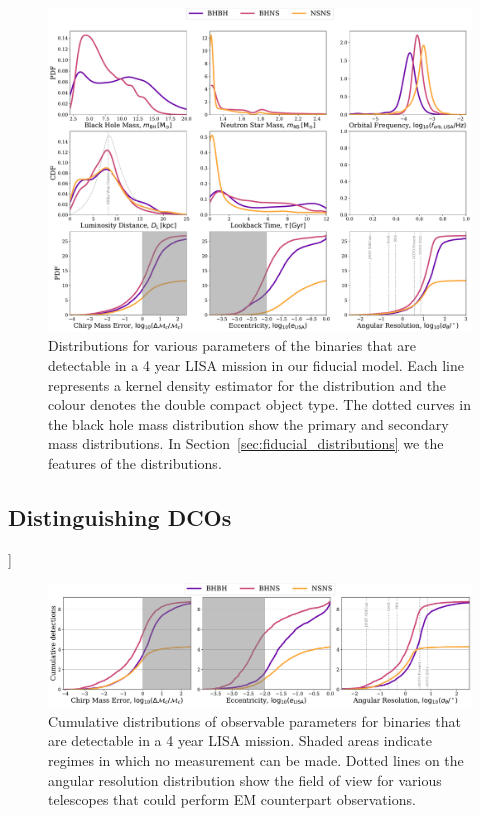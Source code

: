 \documentclass[twocolumn]{aastex63}
\newcommand{\todo}[1]{{\color{red}{[TODO: #1}]}}
\begin{document}
\begin{figure}[htbp]
    \centering
    \includegraphics[width=\textwidth]{distribution_grid.pdf}
    \caption{Distributions for various parameters of the binaries that are detectable in a 4 year LISA mission in our fiducial model. Each line represents a kernel density estimator for the distribution and the colour denotes the double compact object type. The dotted curves in the black hole mass distribution show the primary and secondary mass distributions. In Section~\ref{sec:fiducial_distributions} we the features of the distributions.}
    \label{fig:fiducial_pdf_distributions}
\end{figure}

\subsection{Distinguishing DCOs}
\todo{}

\begin{figure}[htb]
    \centering
    \includegraphics[width=\textwidth]{fiducial_cdf_distributions.pdf}
    \caption{Cumulative distributions of observable parameters for binaries that are detectable in a 4 year LISA mission. Shaded areas indicate regimes in which no measurement can be made. Dotted lines on the angular resolution distribution show the field of view for various telescopes that could perform EM counterpart observations.}
    \label{fig:fiducial_cdf_distributions}
\end{figure}
\end{document}

